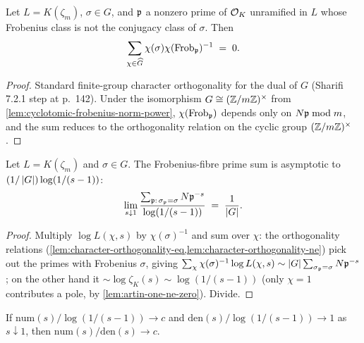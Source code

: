 \begin{lemma}\label{lem:character-orthogonality-ne}
  Let $L = K(\zeta_m)$, $\sigma \in G$, and $\mathfrak{p}$ a nonzero prime of
  $\mathcal{O}_K$ unramified in $L$ whose Frobenius class is not the conjugacy
  class of $\sigma$. Then
  \[
    \sum_{\chi\in\widehat G} \chi(\sigma)\chi(\mathrm{Frob}_{\mathfrak{p}})^{-1} \;=\; 0.
  \]
\end{lemma}

\begin{proof}
  Standard finite-group character orthogonality for the dual of $G$
  (Sharifi 7.2.1 step at p.~142). Under the isomorphism
  $G\cong(\mathbb{Z}/m\mathbb{Z})^\times$ from \cref{lem:cyclotomic-frobenius-norm-power},
  $\chi(\mathrm{Frob}_{\mathfrak{p}})$ depends only on $N\mathfrak{p}\bmod m$, and the sum reduces to
  the orthogonality relation on the cyclic group $(\mathbb{Z}/m\mathbb{Z})^\times$.
\end{proof}

\begin{lemma}\label{lem:primesum-fibre-asymp}
  Let $L = K(\zeta_m)$ and $\sigma \in G$. The Frobenius-fibre prime sum
  is asymptotic to $(1/\left\lvert G \right\rvert)\log(1/(s-1))$:
  \[
    \lim_{s\downarrow 1}
    \frac{\sum_{\mathfrak{p}:\,\sigma_{\mathfrak{p}} = \sigma} N\mathfrak{p}^{-s}}{\log(1/(s-1))}
    \;=\; \frac{1}{\left\lvert G \right\rvert}.
  \]
\end{lemma}

\begin{proof}
  Multiply $\log L(\chi, s)$ by $\chi(\sigma)^{-1}$ and sum over $\chi$:
  the orthogonality relations
  (\cref{lem:character-orthogonality-eq,lem:character-orthogonality-ne})
  pick out the primes with Frobenius $\sigma$, giving
  $\sum_\chi \chi(\sigma)^{-1}\log L(\chi, s) \sim
  \left\lvert G \right\rvert\sum_{\sigma_{\mathfrak{p}}=\sigma} N\mathfrak{p}^{-s}$; on the other hand it
  $\sim \log\zeta_K(s) \sim \log(1/(s-1))$ (only $\chi=1$ contributes a
  pole, by \cref{lem:artin-one-ne-zero}). Divide.
\end{proof}

\begin{lemma}\label{lem:ratio-glue-numerator}
  \leanok
  If $\mathrm{num}(s)/\log(1/(s-1)) \to c$ and
  $\mathrm{den}(s)/\log(1/(s-1)) \to 1$ as $s\downarrow 1$, then
  $\mathrm{num}(s)/\mathrm{den}(s) \to c$.
\end{lemma}

